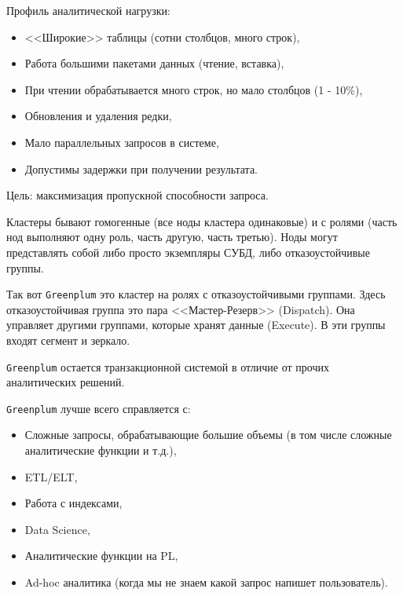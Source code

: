\documentclass[%
	11pt,
	a4paper,
	utf8,
		]{article}
\begin{document}
Профиль аналитической нагрузки:
\begin{itemize}
	\item <<Широкие>> таблицы (сотни столбцов, много строк),
	
	\item Работа большими пакетами данных (чтение, вставка),
	
	\item При чтении обрабатывается много строк, но мало столбцов (1 - 10\%),
	
	\item Обновления и удаления редки,
	
	\item Мало параллельных запросов в системе,
	
	\item Допустимы задержки при получении результата.
\end{itemize}

Цель: максимизация пропускной способности запроса.


Кластеры бывают гомогенные (все ноды кластера одинаковые) и с ролями (часть нод выполняют одну роль, часть другую, часть третью). Ноды могут представлять собой либо просто экземпляры СУБД, либо отказоустойчивые группы.

Так вот \texttt{Greenplum} это кластер на ролях с отказоустойчивыми группами. Здесь отказоустойчивая группа это пара <<Мастер-Резерв>> (Dispatch). Она управляет другими группами, которые хранят данные (Execute). В эти группы входят сегмент и зеркало.

\texttt{Greenplum} остается транзакционной системой в отличие от прочих аналитических решений.


\texttt{Greenplum} лучше всего справляется с:
\begin{itemize}
	\item Сложные запросы, обрабатывающие большие объемы (в том числе сложные аналитические функции и т.д.),
	
	\item {ETL}/{ELT},
	
	\item Работа с индексами,
	
	\item Data Science,
	
	\item Аналитические функции на PL,
	
	\item Ad-hoc аналитика (когда мы не знаем какой запрос напишет пользователь).
\end{itemize}
\end{document}
